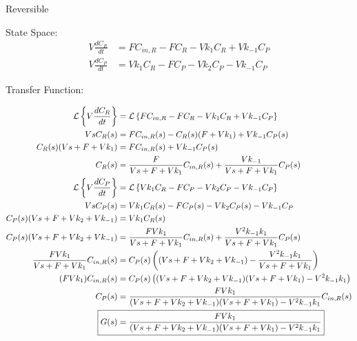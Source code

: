 \documentclass[12pt]{article}
\begin{document}
\begin{enumerate}
\begin{enumerate}
    Reversible

    State Space:
    \begin{align*}
        V \frac{dC_R}{dt} &= F C_{in,R} - F C_R - V k_1 C_R + V k_{-1} C_P \\
        V \frac{dC_P}{dt} &= V k_1 C_R - F C_P - V k_2 C_P - V k_{-1} C_P
    \end{align*}

    Transfer Function:

    \begin{align*}
        \mathcal{L}\left\{V \frac{dC_R}{dt}\right\} &= \mathcal{L}\left\{F C_{in,R} - F C_R - V k_1 C_R + V k_{-1} C_P\right\} \\
        V s C_R(s) &= F C_{in,R}(s) - C_R(s) (F + V k_1) + V k_{-1} C_P(s) \\
        C_R(s) (V s + F + V k_1) &= F C_{in,R}(s) + V k_{-1} C_P(s) \\
        C_R(s) &= \frac{F}{V s + F + V k_1} C_{in,R}(s) + \frac{V k_{-1}}{V s + F + V k_1} C_P(s) \\
        \mathcal{L}\left\{V \frac{dC_P}{dt}\right\} &= \mathcal{L}\left\{V k_1 C_R - F C_P - V k_2 C_P - V k_{-1} C_P\right\} \\
        V s C_P(s) &= V k_1 C_R(s) - F C_P(s) - V k_2 C_P(s) - V k_{-1} C_P \\
        C_P(s) (V s + F + V k_2 + V k_{-1}) &= V k_1 C_R(s) \\
        C_P(s) (V s + F + V k_2 + V k_{-1}) &= \frac{F V k_1}{V s + F + V k_1} C_{in,R}(s) + \frac{V^2 k_{-1} k_1}{V s + F + V k_1} C_P(s) \\
        \frac{F V k_1}{V s + F + V k_1} C_{in,R}(s) &= C_P(s) \left((V s + F + V k_2 + V k_{-1}) - \frac{V^2 k_{-1} k_1}{V s + F + V k_1}\right) \\
        (F V k_1) C_{in,R}(s) &= C_P(s) \left((V s + F + V k_2 + V k_{-1}) (V s + F + V k_1) - V^2 k_{-1} k_1\right) \\
        C_P(s) &= \frac{F V k_1}{(V s + F + V k_2 + V k_{-1}) (V s + F + V k_1) - V^2 k_{-1} k_1} C_{in,R}(s) \\
        \Aboxed{G(s) &= \frac{F V k_1}{(V s + F + V k_2 + V k_{-1}) (V s + F + V k_1) - V^2 k_{-1} k_1}}
    \end{align*}


\end{enumerate}
\end{enumerate}
\end{document}
